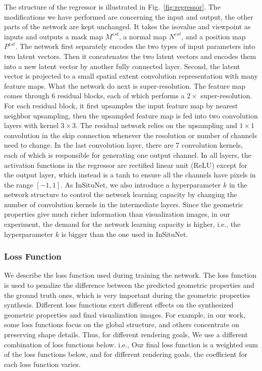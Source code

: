 \documentclass[journal]{vgtc}                %
\begin{document}
The structure of the regressor is illustrated in Fig.~\ref{fig:regressor}. The modifications we have performed are concerning the input and output, the other parts of the network are kept unchanged. It takes the isovalue and viewpoint as inputs and outputs a mask map $M^{est}$, a normal map $N^{est}$, and a position map $P^{est}$. The network first separately encodes the two types of input parameters into two latent vectors. Then it concatenates the two latent vectors and encodes them into a new latent vector by another fully connected layer. Second, the latent vector is projected to a small spatial extent convolution representation with many feature maps. What the network do next is super-resolution. The feature map comes through $6$ residual blocks, each of which performs a $2 \times$ super-resolution. For each residual block, it first upsamples the input feature map by nearest neighbor upsampling, then the upsampled feature map is fed into two convolution layers with kernel $3 \times 3$. The residual network relies on the upsampling and $1 \times 1$ convolution in the skip connection whenever the resolution or number of channels need to change. In the last convolution layer, there are 7 convolution kernels, each of which is responsible for generating one output channel. In all layers, the activation functions in the regressor are rectified linear unit (ReLU) except for the output layer, which instead is a tanh to ensure all the channels have pixels in the range $[-1, 1]$.
As InSituNet, we also introduce a hyperparameter $k$ in the network structure to control the network learning capacity by changing the number of convolution kernels in the intermediate layers. Since the geometric properties give much richer information than visualization images, in our experiment, the demand for the network learning capacity is higher, i.e., the hyperparameter $k$ is bigger than the one used in InSituNet. 

\subsubsection{Loss Function}
\label{subsubsection:loss}

We describe the loss function used during training the network. The loss function is used to penalize the difference between the predicted geometric properties and the ground truth ones, which is very important during the geometric properties synthesis.  Different loss functions exert different effects on the synthesized geometric properties and final visualization images.  For example, in our work, some loss functions focus on the global structure, and others concentrate on preserving shape details. Thus, for different rendering goals, We use a different combination of loss functions below. i.e., Our final loss function is a weighted sum of the loss functions below, and for different rendering goals, the coefficient for each loss function varies.    
\end{document}
